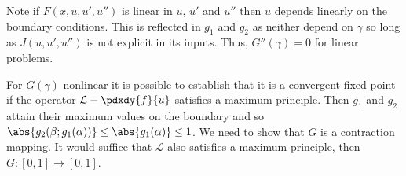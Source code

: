 \documentclass{book}
\begin{document}

Note if $F(x,u,u',u'')$ is linear in $u$, $u'$ and $u''$ then $u$ depends linearly on the boundary conditions.
This is reflected in $g_1$ and $g_2$ as neither depend on $\gamma$ so long as $J(u,u',u'')$ is not explicit in its inputs.
Thus, $G''(\gamma) = 0$ for linear problems.

For $G(\gamma)$ nonlinear it is possible to establish that it is a convergent fixed point if the operator $\mathcal{L} - \pdxdy{f}{u}$ satisfies a maximum principle.
Then $g_1$ and $g_2$ attain their maximum values on the boundary and so $\abs{g_2(\beta;g_1(\alpha))} \leq \abs{g_1(\alpha)} \leq 1$.
We need to show that $G$ is a contraction mapping.
It would suffice that $\mathcal{L}$ also satisfies a maximum principle, then $G:[0,1] \rightarrow [0,1]$.
\end{document}
